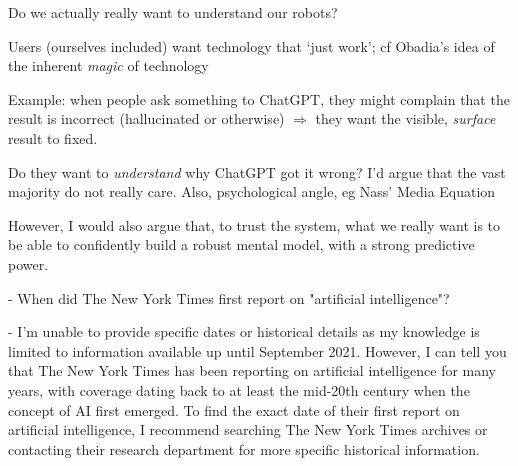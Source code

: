 \documentclass[xcolor=table,aspectratio=169]{beamer}
\begin{document}
\begin{frame}{Do we actually really want to understand our robots?}

    Users (ourselves included) want technology that `just work'; cf Obadia's idea of the inherent \emph{magic} of technology

    \pause

    Example: when people ask something to ChatGPT, they might complain that the
    result is incorrect (hallucinated or otherwise) $\Rightarrow$ they
    want the visible, \emph{surface} result to fixed.

    \pause

    Do they want to \emph{understand} why ChatGPT got it wrong? I'd argue that
    the vast majority do not really care. {\footnotesize Also, psychological
    angle, eg Nass' Media Equation}

    \pause

    However, I would also argue that, to trust the system, what we really want
    is to be able to \alert<5>{confidently} build a
    \alert<6>{robust mental model}, with a strong \alert<7>{predictive
    power}.


\end{frame}

\begin{frame}{}

- When did The New York Times first report on "artificial intelligence"?

- I'm unable to provide specific dates or historical details as my knowledge is limited to information available up until September 2021. However, I can tell you that The New York Times has been reporting on artificial intelligence for many years, with coverage dating back to at least the mid-20th century when the concept of AI first emerged. To find the exact date of their first report on artificial intelligence, I recommend searching The New York Times archives or contacting their research department for more specific historical information.
\end{frame}
\end{document}
